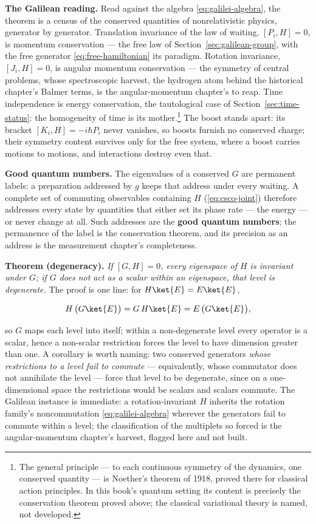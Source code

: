\textbf{The Galilean reading.} Read against the algebra \eqref{eq:galilei-algebra}, the theorem is a census of the conserved quantities of nonrelativistic physics, generator by generator. Translation invariance of the law of waiting, $[P_i,H] = 0$, is momentum conservation --- the free law of Section~\ref{sec:galilean-group}, with the free generator \eqref{eq:free-hamiltonian} its paradigm. Rotation invariance, $[J_i,H] = 0$, is angular momentum conservation --- the symmetry of central problems, whose spectroscopic harvest, the hydrogen atom behind the historical chapter's Balmer terms, is the angular-momentum chapter's to reap. Time independence is energy conservation, the tautological case of Section~\ref{sec:time-status}: the homogeneity of time is its mother.\footnote{The general principle --- to each continuous symmetry of the dynamics, one conserved quantity --- is Noether's theorem of 1918, proved there for classical action principles. In this book's quantum setting its content is precisely the conservation theorem proved above; the classical variational theory is named, not developed.} The boost stands apart: its bracket $[K_i,H] = -i\hbar P_i$ never vanishes, so boosts furnish no conserved charge; their symmetry content survives only for the free system, where a boost carries motions to motions, and interactions destroy even that.

\textbf{Good quantum numbers.} The eigenvalues of a conserved $G$ are permanent labels: a preparation addressed by $g$ keeps that address under every waiting. A complete set of commuting observables containing $H$ (\eqref{eq:csco-joint}) therefore addresses every state by quantities that either set its phase rate --- the energy --- or never change at all. Such addresses are the \textbf{good quantum numbers}; the permanence of the label is the conservation theorem, and its precision as an address is the measurement chapter's completeness.

\textbf{Theorem (degeneracy).} \emph{If $[G,H] = 0$, every eigenspace of $H$ is invariant under $G$; if $G$ does not act as a scalar within an eigenspace, that level is degenerate.} The proof is one line: for $H\ket{E} = E\ket{E}$,
\begin{linenomath}
    \begin{equation}
        H\,\bigl(G\ket{E}\bigr) = G\,H\ket{E} = E\,\bigl(G\ket{E}\bigr) ,
        \label{eq:degeneracy-invariance}
    \end{equation}
\end{linenomath}
so $G$ maps each level into itself; within a non-degenerate level every operator is a scalar, hence a non-scalar restriction forces the level to have dimension greater than one. A corollary is worth naming: two conserved generators \emph{whose restrictions to a level fail to commute} --- equivalently, whose commutator does not annihilate the level --- force that level to be degenerate, since on a one-dimensional space the restrictions would be scalars and scalars commute. The Galilean instance is immediate: a rotation-invariant $H$ inherits the rotation family's noncommutation \eqref{eq:galilei-algebra} wherever the generators fail to commute within a level; the classification of the multiplets so forced is the angular-momentum chapter's harvest, flagged here and not built.

